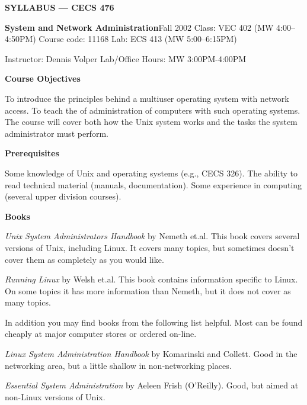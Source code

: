 \centerline{{\bf SYLLABUS --- CECS 476}}
\vskip 5pt
{\obeylines\parindent 0pt
{\bf System and Network Administration}\hfill Fall 2002
Class: VEC 402 (MW 4:00--4:50PM) \hfill Course code: 11168 \hfill Lab: ECS 413 (MW 5:00--6:15PM)

Instructor: Dennis Volper \hfill Lab/Office Hours: MW 3:00PM-4:00PM

}
 
\vskip 5pt
\centerline{\bf Course Objectives}
 
To introduce the principles behind a multiuser operating system with network
access.
To teach the of administration of computers with such operating systems.
The course will cover both how the Unix system works
and the tasks the system administrator must perform.

\vskip 5pt
\centerline{\bf Prerequisites }

Some knowledge of Unix and operating systems (e.g., CECS 326).
The ability to read technical material (manuals, documentation).
Some experience in computing (several upper division courses).
 
\vskip 5pt
\centerline{\bf Books }
 
{\it Unix System Administrators Handbook}
by Nemeth et.al.
This book covers several versions of Unix, including Linux.
It covers many topics, but sometimes doesn't cover them
as completely as you would like.

{\it Running Linux}
by Welsh et.al.
This book contains information specific to Linux.
On some topics it has more information than Nemeth,
but it does not cover as many topics.

In addition you may find books from the following list helpful. 
Most can be found cheaply at major
computer stores or ordered on-line.


{\it Linux System Administration Handbook}
by Komarinski and Collett. 
Good in the networking area, 
but a little shallow in non-networking places.


{\it Essential System Administration} by Aeleen Frish (O'Reilly).
Good, but aimed at non-Linux versions of Unix.

